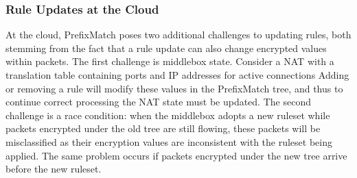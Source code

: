 
%
%
%




\subsubsection{Rule Updates at the Cloud}
\label{sec:updates}
At the cloud, PrefixMatch poses two additional challenges to updating rules, both stemming from the fact that a rule update can also change encrypted values within packets.
The first challenge is middlebox state. Consider a NAT with a translation table containing ports and IP addresses for active connections
Adding or removing a rule will modify these values in the PrefixMatch tree, and thus to continue correct processing the NAT state must be updated.
The second challenge is a race condition: when the middlebox adopts a new ruleset while packets encrypted under the old tree are still flowing, these packets will be misclassified as their encryption values are inconsistent with the ruleset being applied. 
The same problem occurs if packets encrypted under the new tree arrive before the new ruleset.

